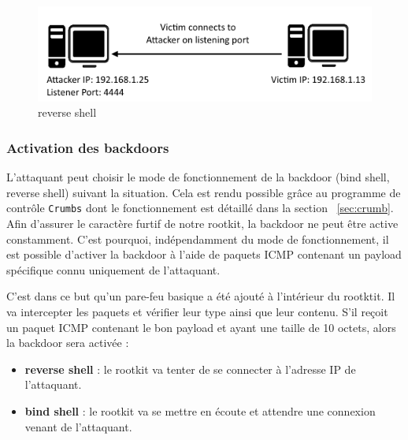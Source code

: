 \documentclass[12pt]{article}
\begin{document}
\begin{figure}[H] 
\begin{center}
\includegraphics{./img/reverse-shell.png}

\caption[dsfsdf]{reverse shell}\label{figure:3}
\end{center}
\end{figure}
            
        \subsubsection{Activation des backdoors}
            
            L'attaquant peut choisir le mode de fonctionnement de la backdoor (bind shell, reverse shell) suivant la situation. Cela est rendu possible grâce au programme de contrôle \texttt{Crumbs} dont le fonctionnement est détaillé dans la section ~\ref{sec:crumb}. 
			Afin d'assurer le caractère furtif de notre rootkit, la backdoor ne peut être active constamment. C'est pourquoi, indépendamment du mode de fonctionnement, il est possible d'activer la backdoor à l'aide de paquets ICMP contenant un payload spécifique connu uniquement de l'attaquant.
            

C'est dans ce but qu'un pare-feu basique a été ajouté à l'intérieur du rootktit. Il va intercepter les paquets et vérifier leur type ainsi que leur contenu. S'il reçoit un paquet ICMP contenant le bon payload et ayant une taille de 10 octets, alors la backdoor sera activée :
\begin{itemize}
 \item \textbf{reverse shell} : le rootkit va tenter de se connecter à l'adresse IP de l'attaquant.
 \item \textbf{bind shell} : le rootkit va se mettre en écoute et attendre une connexion venant de l'attaquant.
\end{itemize}
\end{document}
